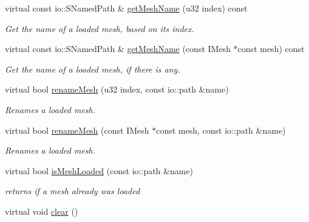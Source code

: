 \begin{DoxyCompactItemize}
virtual const io\-::\-S\-Named\-Path \& \hyperlink{classirr_1_1scene_1_1_c_mesh_cache_aaffea9933da3dc983128235fa97ca30c}{get\-Mesh\-Name} (u32 index) const 
\begin{DoxyCompactList}\small\item\em Get the name of a loaded mesh, based on its index. \end{DoxyCompactList}\item 
virtual const io\-::\-S\-Named\-Path \& \hyperlink{classirr_1_1scene_1_1_c_mesh_cache_a7f67be318a32798252f9a6c65b7f7c24}{get\-Mesh\-Name} (const I\-Mesh $\ast$const mesh) const 
\begin{DoxyCompactList}\small\item\em Get the name of a loaded mesh, if there is any. \end{DoxyCompactList}\item 
virtual bool \hyperlink{classirr_1_1scene_1_1_c_mesh_cache_abe54b86a1c435a6ca17b4d6940042e98}{rename\-Mesh} (u32 index, const io\-::path \&name)
\begin{DoxyCompactList}\small\item\em Renames a loaded mesh. \end{DoxyCompactList}\item 
virtual bool \hyperlink{classirr_1_1scene_1_1_c_mesh_cache_aab6d74814daad7c9856fa5221a21871e}{rename\-Mesh} (const I\-Mesh $\ast$const mesh, const io\-::path \&name)
\begin{DoxyCompactList}\small\item\em Renames a loaded mesh. \end{DoxyCompactList}\item 
\hypertarget{classirr_1_1scene_1_1_c_mesh_cache_a86b3dc1b29ef9c84899e440a05ab4816}{virtual bool \hyperlink{classirr_1_1scene_1_1_c_mesh_cache_a86b3dc1b29ef9c84899e440a05ab4816}{is\-Mesh\-Loaded} (const io\-::path \&name)}\label{classirr_1_1scene_1_1_c_mesh_cache_a86b3dc1b29ef9c84899e440a05ab4816}

\begin{DoxyCompactList}\small\item\em returns if a mesh already was loaded \end{DoxyCompactList}\item 
\hypertarget{classirr_1_1scene_1_1_c_mesh_cache_ad314af4e247b4e8ba952953bc4f6f853}{virtual void \hyperlink{classirr_1_1scene_1_1_c_mesh_cache_ad314af4e247b4e8ba952953bc4f6f853}{clear} ()}\label{classirr_1_1scene_1_1_c_mesh_cache_ad314af4e247b4e8ba952953bc4f6f853}


\end{DoxyCompactItemize}

